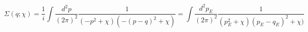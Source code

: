 \begin{equation}
\Sigma(q; \chi) = \frac{1} {i} \int \frac{d^2 p}{(2\pi)^2} \frac{1}{(-p^2 +
\chi)(-(p-q)^2 + \chi)}= \int \frac{d^2 p_E}{(2\pi)^2} \frac{1}{(p_E^2 +
\chi)(p_E-q_E)^2 + \chi)}
\end{equation}

